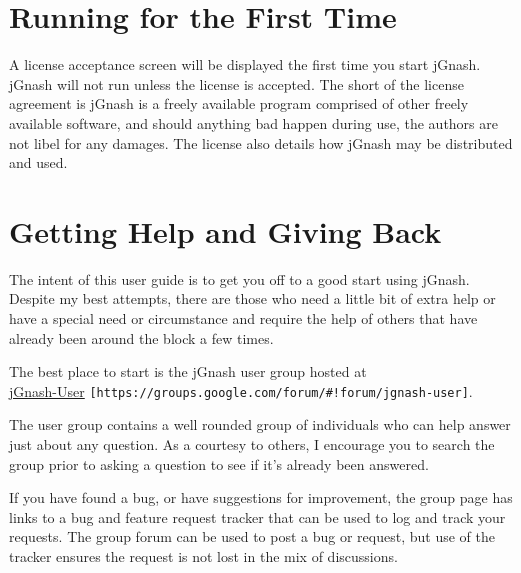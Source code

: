 \documentclass[letterpaper,12pt]{book}
\begin{document}
    \section{Running for the First Time}\label{sec:running-for-the-first-time}
    A license acceptance screen will be displayed the first time you start jGnash.
    jGnash will not run unless the license is accepted.
    The short of the license agreement is jGnash is a freely available program comprised of other freely available software,
    and should anything bad happen during use, the authors are not libel for any damages.
    The license also details how jGnash may be distributed and used.


    \section{Getting Help and Giving Back}\label{sec:getting-help-and-giving-back}
    The intent of this user guide is to get you off to a good start using jGnash.
    Despite my best attempts, there are those who need a little bit of extra help or have a special need or
    circumstance and require the help of others that have already been around the block a few times.

    The best place to start is the jGnash user group hosted at \\
    \href{https://groups.google.com/forum/#!forum/jgnash-user}{jGnash-User} \texttt{[https://groups.google.com/forum/\#!forum/jgnash-user]}.

    The user group contains a well rounded group of individuals who can help answer just about any question.
    As a courtesy to others, I encourage you to search the group prior to asking a question to see if it's already
    been answered.

    If you have found a bug, or have suggestions for improvement, the group page has links to a bug and feature request
    tracker that can be used to log and track your requests.
    The group forum can be used to post a bug or request, but use of the tracker ensures the request is not lost in
    the mix of discussions.
\end{document}
